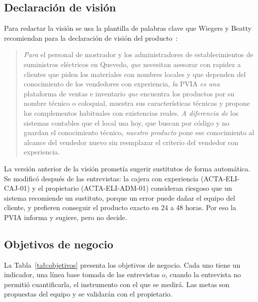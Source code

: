 \subsection{Declaración de visión}

Para redactar la visión se usa la plantilla de palabras clave que Wiegers y Beatty recomiendan para la declaración de visión del producto~\cite{wiegers2013}:

\begin{quote}
\textit{Para} el personal de mostrador y los administradores de establecimientos de suministros eléctricos en Quevedo, \textit{que} necesitan asesorar con rapidez a clientes que piden los materiales con nombres locales y que dependen del conocimiento de los vendedores con experiencia, \textit{la} PVIA \textit{es una} plataforma de ventas e inventario \textit{que} encuentra los productos por su nombre técnico o coloquial, muestra sus características técnicas y propone los complementos habituales con existencias reales. \textit{A diferencia de} los sistemas contables que el local usa hoy, que buscan por código y no guardan el conocimiento técnico, \textit{nuestro producto} pone ese conocimiento al alcance del vendedor nuevo sin reemplazar el criterio del vendedor con experiencia.
\end{quote}

La versión anterior de la visión prometía sugerir sustitutos de forma automática. Se modificó después de las entrevistas: la cajera con experiencia (ACTA-ELI-CAJ-01) y el propietario (ACTA-ELI-ADM-01) consideran riesgoso que un sistema recomiende un sustituto, porque un error puede dañar el equipo del cliente, y prefieren conseguir el producto exacto en 24 a 48 horas. Por eso la PVIA informa y sugiere, pero no decide.

\subsection{Objetivos de negocio}

La Tabla~\ref{tab:objetivos} presenta los objetivos de negocio. Cada uno tiene un indicador, una línea base tomada de las entrevistas o, cuando la entrevista no permitió cuantificarla, el instrumento con el que se medirá. Las metas son propuestas del equipo y se validarán con el propietario.

